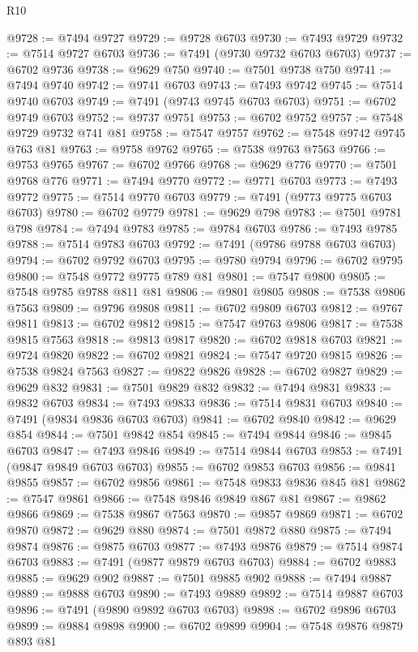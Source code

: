 \begin{lexlean}{R10}
\begin{coremodule}
@9728 := @7494 @9727
@9729 := @9728 @6703
@9730 := @7493 @9729
@9732 := @7514 @9727 @6703
@9736 := @7491 (@9730 @9732 @6703 @6703)
@9737 := @6702 @9736
@9738 := @9629 @750
@9740 := @7501 @9738 @750
@9741 := @7494 @9740
@9742 := @9741 @6703
@9743 := @7493 @9742
@9745 := @7514 @9740 @6703
@9749 := @7491 (@9743 @9745 @6703 @6703)
@9751 := @6702 @9749 @6703
@9752 := @9737 @9751
@9753 := @6702 @9752
@9757 := @7548 @9729 @9732 @741 @81
@9758 := @7547 @9757
@9762 := @7548 @9742 @9745 @763 @81
@9763 := @9758 @9762
@9765 := @7538 @9763 @7563
@9766 := @9753 @9765
@9767 := @6702 @9766
@9768 := @9629 @776
@9770 := @7501 @9768 @776
@9771 := @7494 @9770
@9772 := @9771 @6703
@9773 := @7493 @9772
@9775 := @7514 @9770 @6703
@9779 := @7491 (@9773 @9775 @6703 @6703)
@9780 := @6702 @9779
@9781 := @9629 @798
@9783 := @7501 @9781 @798
@9784 := @7494 @9783
@9785 := @9784 @6703
@9786 := @7493 @9785
@9788 := @7514 @9783 @6703
@9792 := @7491 (@9786 @9788 @6703 @6703)
@9794 := @6702 @9792 @6703
@9795 := @9780 @9794
@9796 := @6702 @9795
@9800 := @7548 @9772 @9775 @789 @81
@9801 := @7547 @9800
@9805 := @7548 @9785 @9788 @811 @81
@9806 := @9801 @9805
@9808 := @7538 @9806 @7563
@9809 := @9796 @9808
@9811 := @6702 @9809 @6703
@9812 := @9767 @9811
@9813 := @6702 @9812
@9815 := @7547 @9763 @9806
@9817 := @7538 @9815 @7563
@9818 := @9813 @9817
@9820 := @6702 @9818 @6703
@9821 := @9724 @9820
@9822 := @6702 @9821
@9824 := @7547 @9720 @9815
@9826 := @7538 @9824 @7563
@9827 := @9822 @9826
@9828 := @6702 @9827
@9829 := @9629 @832
@9831 := @7501 @9829 @832
@9832 := @7494 @9831
@9833 := @9832 @6703
@9834 := @7493 @9833
@9836 := @7514 @9831 @6703
@9840 := @7491 (@9834 @9836 @6703 @6703)
@9841 := @6702 @9840
@9842 := @9629 @854
@9844 := @7501 @9842 @854
@9845 := @7494 @9844
@9846 := @9845 @6703
@9847 := @7493 @9846
@9849 := @7514 @9844 @6703
@9853 := @7491 (@9847 @9849 @6703 @6703)
@9855 := @6702 @9853 @6703
@9856 := @9841 @9855
@9857 := @6702 @9856
@9861 := @7548 @9833 @9836 @845 @81
@9862 := @7547 @9861
@9866 := @7548 @9846 @9849 @867 @81
@9867 := @9862 @9866
@9869 := @7538 @9867 @7563
@9870 := @9857 @9869
@9871 := @6702 @9870
@9872 := @9629 @880
@9874 := @7501 @9872 @880
@9875 := @7494 @9874
@9876 := @9875 @6703
@9877 := @7493 @9876
@9879 := @7514 @9874 @6703
@9883 := @7491 (@9877 @9879 @6703 @6703)
@9884 := @6702 @9883
@9885 := @9629 @902
@9887 := @7501 @9885 @902
@9888 := @7494 @9887
@9889 := @9888 @6703
@9890 := @7493 @9889
@9892 := @7514 @9887 @6703
@9896 := @7491 (@9890 @9892 @6703 @6703)
@9898 := @6702 @9896 @6703
@9899 := @9884 @9898
@9900 := @6702 @9899
@9904 := @7548 @9876 @9879 @893 @81

\end{coremodule}
\end{lexlean}
